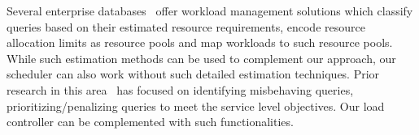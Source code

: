 
Several enterprise databases~\cite{res_gov, rm, DB2, teradatawm, gpdb, hpwm} offer
workload management solutions which %
classify queries based on their estimated resource requirements, %
encode resource allocation limits as resource pools and map workloads to such resource pools. 
While such estimation methods can be used to complement our approach, 
our scheduler can also work without such detailed estimation techniques. 
Prior research in this area~\cite{krompass2007dynamic, krompass2006quality} has focused on identifying misbehaving queries, prioritizing/penalizing queries to meet the service level objectives.
Our load controller can be complemented with such functionalities.


